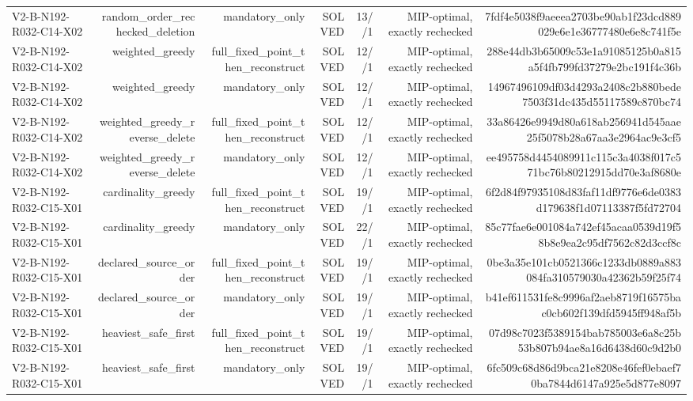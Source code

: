 {\begin{longtable}{lrrrrrr}
V2-B-N192-R032-C14-X02 & random\_order\_rechecked\_deletion & mandatory\_only & SOLVED & 13//1 & MIP-optimal, exactly rechecked & 7fdf4e5038f9aeeea2703be90ab1f23dcd889029e6e1e36777480e6e8c741f5e \\
V2-B-N192-R032-C14-X02 & weighted\_greedy & full\_fixed\_point\_then\_reconstruct & SOLVED & 12//1 & MIP-optimal, exactly rechecked & 288e44db3b65009c53e1a91085125b0a815a5f4fb799fd37279e2bc191f4c36b \\
V2-B-N192-R032-C14-X02 & weighted\_greedy & mandatory\_only & SOLVED & 12//1 & MIP-optimal, exactly rechecked & 14967496109df03d4293a2408c2b880bede7503f31dc435d55117589c870bc74 \\
V2-B-N192-R032-C14-X02 & weighted\_greedy\_reverse\_delete & full\_fixed\_point\_then\_reconstruct & SOLVED & 12//1 & MIP-optimal, exactly rechecked & 33a86426e9949d80a618ab256941d545aae25f5078b28a67aa3e2964ac9e3cf5 \\
V2-B-N192-R032-C14-X02 & weighted\_greedy\_reverse\_delete & mandatory\_only & SOLVED & 12//1 & MIP-optimal, exactly rechecked & ee495758d4454089911c115c3a4038f017c571bc76b80212915dd70e3af8680e \\
V2-B-N192-R032-C15-X01 & cardinality\_greedy & full\_fixed\_point\_then\_reconstruct & SOLVED & 19//1 & MIP-optimal, exactly rechecked & 6f2d84f97935108d83faf11df9776e6de0383d179638f1d07113387f5fd72704 \\
V2-B-N192-R032-C15-X01 & cardinality\_greedy & mandatory\_only & SOLVED & 22//1 & MIP-optimal, exactly rechecked & 85c77fae6e001084a742ef45acaa0539d19f58b8e9ea2c95df7562c82d3ccf8c \\
V2-B-N192-R032-C15-X01 & declared\_source\_order & full\_fixed\_point\_then\_reconstruct & SOLVED & 19//1 & MIP-optimal, exactly rechecked & 0be3a35e101cb0521366c1233db0889a883084fa310579030a42362b59f25f74 \\
V2-B-N192-R032-C15-X01 & declared\_source\_order & mandatory\_only & SOLVED & 19//1 & MIP-optimal, exactly rechecked & b41ef611531fe8c9996af2aeb8719f16575bac0cb602f139dfd5945ff948af5b \\
V2-B-N192-R032-C15-X01 & heaviest\_safe\_first & full\_fixed\_point\_then\_reconstruct & SOLVED & 19//1 & MIP-optimal, exactly rechecked & 07d98c7023f5389154bab785003e6a8c25b53b807b94ae8a16d6438d60c9d2b0 \\
V2-B-N192-R032-C15-X01 & heaviest\_safe\_first & mandatory\_only & SOLVED & 19//1 & MIP-optimal, exactly rechecked & 6fc509c68d86d9bca21e8208e46fef0ebaef70ba7844d6147a925e5d877e8097 \\

\end{longtable}}
